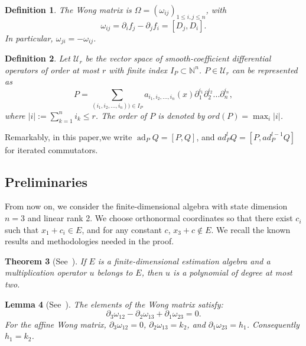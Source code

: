 \documentclass{tCON2e}
\newenvironment{revision}{\begingroup\color{black}}{\endgroup}
\numberwithin{equation}{section}
\theoremstyle{journalplain}
\newtheorem{theorem}{Theorem}[section]
\newtheorem{lemma}[theorem]{Lemma}
\theoremstyle{journaldef}
\newtheorem{definition}[theorem]{Definition}
\DeclareMathOperator{\ad}{ad}
\newenvironment{revision}{}{}
\begin{document}
\begin{revision}
\begin{definition}
The Wong matrix is $\Omega=(\omega_{ij})_{1\le i,j\le n}$, with
\begin{equation}
\omega_{ij}=\partial_i f_j-\partial_j f_i=[D_j,D_i].
\label{eq:wong-def}
\end{equation}
In particular, $\omega_{ji}=-\omega_{ij}$.
\end{definition}

\begin{definition}
Let $\mathcal U_r$ be the vector space of smooth-coefficient differential
operators of order at most $r$ with finite index $I_P \subset \mathbb N^n$. $P \in \mathcal U_r$ can be represented as
\[
P=\sum_{(i_1,i_2,...,i_n)) \in I_P}a_{i_1,i_2,...,i_n}(x)\partial_1^{i_1}\partial_2^{i_2}...\partial_n^{i_n},
\]
where $|i|:=\sum_{k=1}^n i_k \le r$. The order of $P$ is denoted by $ord(P) = \max_i |i|$.
\end{definition}

Remarkably, in this paper,we write $\ad_P Q=[P,Q]$, and $ad_P^l Q = [P,ad_P^{l-1}Q]$ for iterated commutators.

\subsection{Preliminaries}
From now on, we consider the finite-dimensional algebra with state dimension $n = 3$ and linear rank 2. We choose orthonormal coordinates so that there exist $c_i$ such that $x_1 + c_i \in E$, and for any constant $c$, $x_3 + c \notin E$.
We recall the known results and methodologies needed in the proof.

\begin{theorem}[See~\citep{Ocone1981Finite}]\label{thm:ocone}
If $E$ is a finite-dimensional estimation algebra and a multiplication
operator $u$ belongs to $E$, then $u$ is a polynomial of degree at most two.
\end{theorem}
\begin{lemma}[See~\citet{Yau2005Classification,Wu2006Classification}]\label{lem:bianchi}
The elements of the Wong matrix satisfy:
\begin{equation}
\partial_3\omega_{12}-\partial_2\omega_{13}+\partial_1\omega_{23}=0.
\label{eq:Bianchi}
\end{equation}
For the affine Wong matrix, $\partial_3\omega_{12}=0$,
$\partial_2\omega_{13}=k_2$, and $\partial_1\omega_{23}=h_1$.
Consequently $h_1=k_2$.
\end{lemma}


\end{revision}
\end{document}
